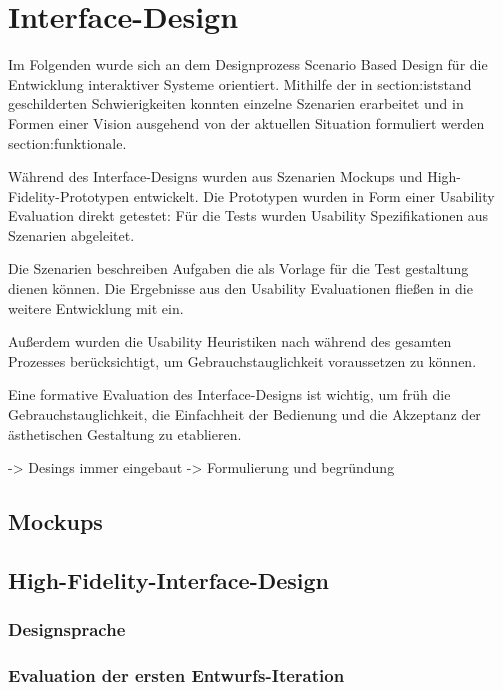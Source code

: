 \chapter{Interface-Design}
\label{chapter-design}
Im Folgenden wurde sich an dem Designprozess Scenario Based Design für die Entwicklung interaktiver
Systeme orientiert. Mithilfe der in \refname{section:iststand} geschilderten Schwierigkeiten konnten
einzelne Szenarien erarbeitet und in Formen einer Vision ausgehend von der aktuellen Situation
formuliert werden \refname{section:funktionale}.

Während des Interface-Designs wurden aus Szenarien Mockups und High-Fidelity-Prototypen entwickelt.
Die Prototypen wurden in Form einer Usability Evaluation direkt getestet: Für die Tests wurden
Usability Spezifikationen aus Szenarien abgeleitet.

Die Szenarien beschreiben Aufgaben die als Vorlage für die Test gestaltung dienen können. Die
Ergebnisse aus den Usability Evaluationen fließen in die weitere Entwicklung mit ein.

Außerdem wurden die Usability Heuristiken nach  während des gesamten
Prozesses berücksichtigt, um Gebrauchstauglichkeit voraussetzen zu können.

Eine formative Evaluation des Interface-Designs ist wichtig, um früh die Gebrauchstauglichkeit,
die Einfachheit der Bedienung und die Akzeptanz der ästhetischen Gestaltung zu etablieren.


-> Desings immer eingebaut -> Formulierung und begründung
\section{Mockups}

\section{High-Fidelity-Interface-Design}
\subsection{Designsprache}

\subsection{Evaluation der ersten Entwurfs-Iteration}


